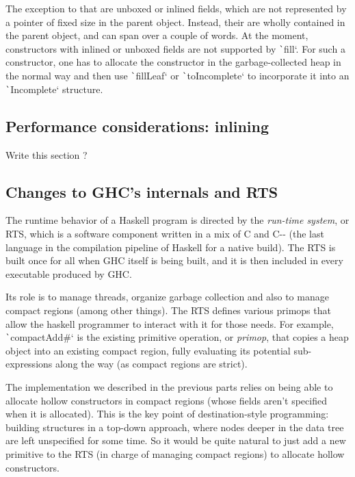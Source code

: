 \documentclass[english]{jflart}
\newcommand{\TODO}[1]{{\color{red}\large #1}}
\begin{document}
The exception to that are unboxed or inlined fields, which are not represented by a pointer of fixed size in the parent object. Instead, their are wholly contained in the parent object, and can span over a couple of words. At the moment, constructors with inlined or unboxed fields are not supported by \texttt`fill`. For such a constructor, one has to allocate the constructor in the garbage-collected heap in the normal way and then use \texttt`fillLeaf` or \texttt`toIncomplete` to incorporate it into an \texttt`Incomplete` structure.

\subsection{Performance considerations: inlining}

\TODO{Write this section ?}

\subsection{Changes to GHC's internals and RTS}

The runtime behavior of a Haskell program is directed by the \emph{run-time system}, or RTS, which is a software component written in a mix of C and C-{}- (the last language in the compilation pipeline of Haskell for a native build). The RTS is built once for all when GHC itself is being built, and it is then included in every executable produced by GHC.

Its role is to manage threads, organize garbage collection and also to manage compact regions (among other things). The RTS defines various primops that allow the haskell programmer to interact with it for those needs. For example, \texttt`compactAdd#` is the existing primitive operation, or \emph{primop}, that copies a heap object into an existing compact region, fully evaluating its potential sub-expressions along the way (as compact regions are strict).

The implementation we described in the previous parts relies on being able to allocate hollow constructors in compact regions (whose fields aren't specified when it is allocated). This is the key point of destination-style programming: building structures in a top-down approach, where nodes deeper in the data tree are left unspecified for some time. So it would be quite natural to just add a new primitive to the RTS (in charge of managing compact regions) to allocate hollow constructors.
\end{document}

